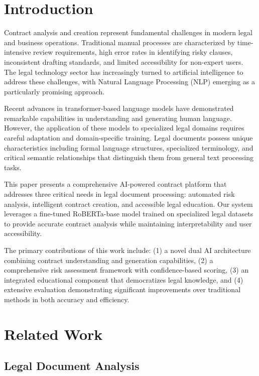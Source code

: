 \documentclass[conference]{IEEEtran}
\begin{document}
\section{Introduction}

Contract analysis and creation represent fundamental challenges in modern legal and business operations. Traditional manual processes are characterized by time-intensive review requirements, high error rates in identifying risky clauses, inconsistent drafting standards, and limited accessibility for non-expert users. The legal technology sector has increasingly turned to artificial intelligence to address these challenges, with Natural Language Processing (NLP) emerging as a particularly promising approach.

Recent advances in transformer-based language models have demonstrated remarkable capabilities in understanding and generating human language. However, the application of these models to specialized legal domains requires careful adaptation and domain-specific training. Legal documents possess unique characteristics including formal language structures, specialized terminology, and critical semantic relationships that distinguish them from general text processing tasks.

This paper presents a comprehensive AI-powered contract platform that addresses three critical needs in legal document processing: automated risk analysis, intelligent contract creation, and accessible legal education. Our system leverages a fine-tuned RoBERTa-base model trained on specialized legal datasets to provide accurate contract analysis while maintaining interpretability and user accessibility.

The primary contributions of this work include: (1) a novel dual AI architecture combining contract understanding and generation capabilities, (2) a comprehensive risk assessment framework with confidence-based scoring, (3) an integrated educational component that democratizes legal knowledge, and (4) extensive evaluation demonstrating significant improvements over traditional methods in both accuracy and efficiency.

\section{Related Work}

\subsection{Legal Document Analysis}
\end{document}
